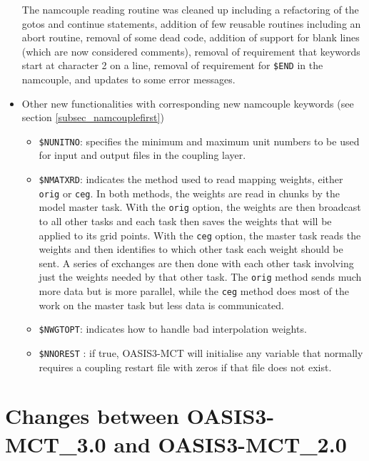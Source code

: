 \begin{itemize}
The namcouple reading routine was cleaned up including a refactoring of the gotos and continue statements, addition of few reusable routines including an abort routine, removal of some dead code, addition of support for blank lines (which are now considered comments), removal of requirement that keywords start at character 2 on a line, removal of requirement for {\tt \$END} in the namcouple, and updates to some error messages.

\item Other new functionalities with corresponding new namcouple keywords (see section \ref{subsec_namcouplefirst})

	\begin{itemize}

	\item {\tt \$NUNITNO}: specifies the minimum and maximum unit numbers to be used for input and output files in the coupling layer.
	
	\item {\tt \$NMATXRD}: indicates the method used to read mapping weights, either {\tt orig} or {\tt ceg}. In both methods, the weights are read in chunks by the model master task. With the {\tt orig} option, the weights are then broadcast to all other tasks and each task then saves the weights that will be applied to its grid points. With the {\tt ceg} option, the master task reads the weights and then identifies to which other task each weight should be sent.  A series of exchanges are then done with each other task involving just the weights needed by that other task. The {\tt orig} method sends much more data but is more parallel, while the {\tt ceg} method does most of the work on the master task but less data is communicated.
	
	\item {\tt \$NWGTOPT}: indicates how to handle bad interpolation weights. 
	
	\item {\tt \$NNOREST} : if true, OASIS3-MCT will initialise any variable that normally requires a coupling restart file with zeros if that file does not exist. 

	\end{itemize}
\end{itemize}

\section{Changes between OASIS3-MCT\_3.0 and OASIS3-MCT\_2.0}
\label{sec_oa2_oa3}
  
